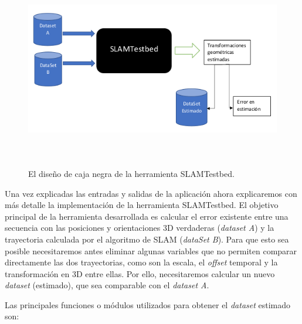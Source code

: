 \begin{figure}[H]
\begin{center}
\label{fig:Open File}\includegraphics[height=8.0cm,width=14.0cm]{img/cap5/Esquema_TFM_CajaNegra2.png}
\hspace{0.5cm}
\end{center}
\caption{ El diseño de caja negra de la herramienta SLAMTestbed. }
\end{figure}

Una vez explicadas las entradas y salidas de la aplicación ahora explicaremos
con más detalle la implementación de la herramienta SLAMTestbed. El objetivo principal de la herramienta desarrollada es calcular el error existente entre una secuencia con las posiciones y orientaciones 3D verdaderas (\textit{dataset A}) y la trayectoria calculada por el algoritmo de SLAM (\textit{dataSet B}). Para que esto sea posible necesitaremos antes eliminar algunas variables que no permiten comparar directamente las dos trayectorias, como son la escala, el \textit{offset} temporal y la transformación en 3D entre ellas. Por ello, necesitaremos calcular un nuevo \textit{dataset} (estimado), que sea comparable con el \textit{dataset A}. 

Las principales funciones o módulos utilizados para obtener el \textit{dataset} estimado son:

